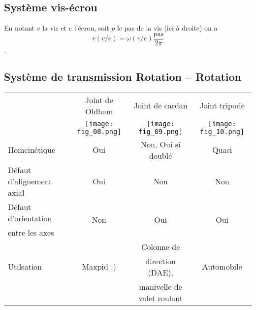 \subsection{Système vis-écrou}
\begin{resultat}
En notant $v$ la vis et $e$ l'écrou, soit $p$ le pas de la vis (ici à droite) on a 
$$v(v/e)=\omega(v/e) \dfrac{\text{pas}}{2 \pi}$$.
\end{resultat}

\subsection{Système de transmission Rotation -- Rotation}
\begin{table*}[!h]
\begin{tabular}{lccc}
\cline{2-4}
& Joint de Oldham & Joint de cardan & Joint tripode \\ \cline{2-4}
\cline{2-4}
&\texttt{[image: fig\_08.png]}&\texttt{[image: fig\_09.png]}& 
\texttt{[image: fig\_10.png]}\\ \hline
Homcinétique & Oui & Non, Oui si doublé & Quasi \\ %
Défaut d'alignement axial & Oui & Non & Non \\ %
Défaut d'orientation & \multirow{2}{*}{Non} &  \multirow{2}{*}{Oui}& \multirow{2}{*}{Oui} \\ 
entre les axes  & & & \\ %
 & & Colonne de & \\
Utilsation&Maxpid :) &  direction (DAE),  & Automobile \\
&&  manivelle de volet roulant & \\
\hline
\end{tabular}
\end{table*}
